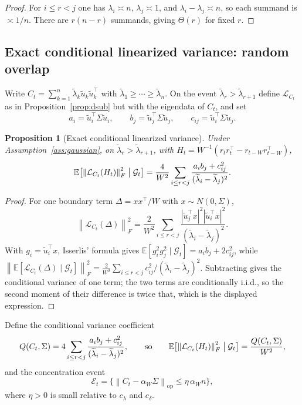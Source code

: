 \documentclass[11pt]{article}
\theoremstyle{tightplain}
\newtheorem{proposition}[theorem]{Proposition}
\theoremstyle{tightdef}
\DeclareMathOperator{\op}{op}
\newcommand{\E}{\mathbb E}
\newcommand{\norm}[1]{\left\lVert #1 \right\rVert}
\newcommand{\abs}[1]{\left\lvert #1 \right\rvert}
\newcommand{\Gcal}{\mathcal G}
\newcommand{\Ecal}{\mathcal E}
\begin{document}
\begin{proof}
For $i\le r<j$ one has $\lambda_i\asymp n$, $\lambda_j\asymp 1$, and
$\lambda_i-\lambda_j\asymp n$, so each summand is $\asymp 1/n$. There are
$r(n-r)$ summands, giving $\Theta(r)$ for fixed $r$.
\end{proof}

\subsection{Exact conditional linearized variance: random overlap}\label{sec:condvar}

Write $C_t=\sum_{k=1}^n\widetilde\lambda_k\widetilde u_k\widetilde u_k^\top$ with
$\widetilde\lambda_1\ge\cdots\ge\widetilde\lambda_n$. On the event
$\widetilde\lambda_r>\widetilde\lambda_{r+1}$ define $\mathcal L_{C_t}$ as in
Proposition~\ref{prop:dsub} but with the eigendata of $C_t$, and set
\[
a_i=\widetilde u_i^\top\Sigma\widetilde u_i,
\qquad
b_j=\widetilde u_j^\top\Sigma\widetilde u_j,
\qquad
c_{ij}=\widetilde u_i^\top\Sigma\widetilde u_j .
\]

\begin{proposition}[Exact conditional linearized variance]\label{prop:conditionallinearized}
Under Assumption~\ref{ass:gaussian}, on $\widetilde\lambda_r>\widetilde\lambda_{r+1}$,
with $H_t=W^{-1}(r_t r_t^\top-r_{t-W}r_{t-W}^\top)$,
\[
\E\bigl[\norm{\mathcal L_{C_t}(H_t)}_F^2\bigm|\Gcal_t\bigr]
=\frac4{W^2}\sum_{i\le r<j}\frac{a_i b_j+c_{ij}^2}{(\widetilde\lambda_i-\widetilde\lambda_j)^2}.
\]
\end{proposition}

\begin{proof}
For one boundary term $\Delta=xx^\top/W$ with $x\sim N(0,\Sigma)$,
\[
\norm{\mathcal L_{C_t}(\Delta)}_F^2
=\frac2{W^2}\sum_{i\le r<j}
\frac{\abs{\widetilde u_j^\top x}^2\abs{\widetilde u_i^\top x}^2}
{(\widetilde\lambda_i-\widetilde\lambda_j)^2}.
\]
With $g_i=\widetilde u_i^\top x$, Isserlis' formula gives
$\E[g_i^2 g_j^2\mid\Gcal_t]=a_i b_j+2c_{ij}^2$, while
$\norm{\E[\mathcal L_{C_t}(\Delta)\mid\Gcal_t]}_F^2
=\tfrac2{W^2}\sum_{i\le r<j}c_{ij}^2/(\widetilde\lambda_i-\widetilde\lambda_j)^2$.
Subtracting gives the conditional variance of one term; the two terms are
conditionally i.i.d., so the second moment of their difference is twice that, which
is the displayed expression.
\end{proof}

Define the conditional variance coefficient
\[
Q(C_t,\Sigma)
=4\sum_{i\le r<j}\frac{a_i b_j+c_{ij}^2}{(\widetilde\lambda_i-\widetilde\lambda_j)^2},
\qquad\text{so}\qquad
\E\bigl[\norm{\mathcal L_{C_t}(H_t)}_F^2\bigm|\Gcal_t\bigr]=\frac{Q(C_t,\Sigma)}{W^2},
\]
and the concentration event
\[
\Ecal_t=\bigl\{\norm{C_t-\alpha_W\Sigma}_{\op}\le \eta\,\alpha_W n\bigr\},
\]
where $\eta>0$ is small relative to $c_\lambda$ and $c_\delta$.
\end{document}
